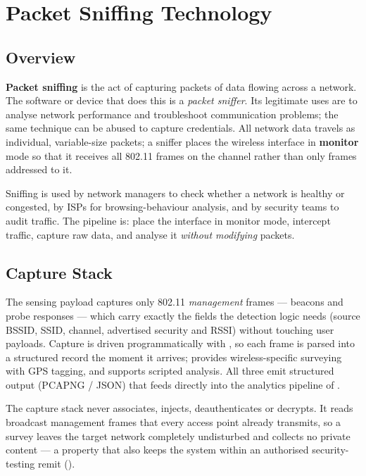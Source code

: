 
\chapter{Packet Sniffing Technology}
\label{ch:sniff}

\section{Overview}
\textbf{Packet sniffing} is the act of capturing packets of data flowing across a
network. The software or device that does this is a \emph{packet sniffer}. Its
legitimate uses are to analyse network performance and troubleshoot
communication problems; the same technique can be abused to capture credentials.
All network data travels as individual, variable-size packets; a sniffer places
the wireless interface in \textbf{monitor} mode so that it receives all 802.11
frames on the channel rather than only frames addressed to it.

Sniffing is used by network managers to check whether a network is healthy or
congested, by ISPs for browsing-behaviour analysis, and by security teams to
audit traffic. The pipeline is: place the interface in monitor mode, intercept
traffic, capture raw data, and analyse it \emph{without modifying} packets.

\section{Capture Stack}
The sensing payload captures only 802.11 \emph{management} frames --- beacons and
probe responses --- which carry exactly the fields the detection logic needs
(source BSSID, SSID, channel, advertised security and RSSI) without touching user
payloads. Capture is driven programmatically with , so each frame is
parsed into a structured record the moment it arrives;  provides
wireless-specific surveying with GPS tagging, and  supports scripted
analysis. All three emit structured output (PCAPNG / JSON) that feeds directly
into the analytics pipeline of .

\begin{highlight}
The capture stack never associates, injects, deauthenticates or decrypts. It
reads broadcast management frames that every access point already transmits, so a
survey leaves the target network completely undisturbed and collects no private
content --- a property that also keeps the system within an authorised
security-testing remit ().
\end{highlight}

